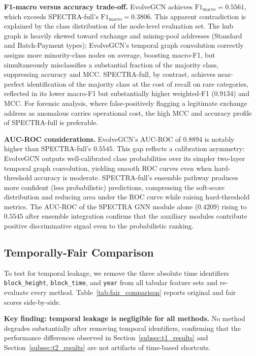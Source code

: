 \documentclass[journal]{IEEEtran}
\begin{document}
\textbf{F1-macro versus accuracy trade-off.}
EvolveGCN achieves $\text{F1}_{\text{macro}} = \num{0.5561}$, which
exceeds SPECTRA-full's $\text{F1}_{\text{macro}} = \num{0.3806}$.
This apparent contradiction is explained by the class distribution of the
node-level evaluation set.
The hub graph is heavily skewed toward exchange and mining-pool addresses
(Standard and Batch-Payment types); EvolveGCN's temporal graph convolution
correctly assigns more minority-class nodes on average, boosting macro-F1,
but simultaneously misclassifies a substantial fraction of the majority
class, suppressing accuracy and MCC.
SPECTRA-full, by contrast, achieves near-perfect identification of the
majority class at the cost of recall on rare categories, reflected in its
lower macro-F1 but substantially higher weighted-F1 ($\num{0.9134}$)
and MCC.
For forensic analysis, where false-positively flagging a legitimate exchange
address as anomalous carries operational cost, the high MCC and accuracy
profile of SPECTRA-full is preferable.

\textbf{AUC-ROC considerations.}
EvolveGCN's AUC-ROC of \num{0.8894} is notably higher than SPECTRA-full's
$\num{0.5545}$.
This gap reflects a calibration asymmetry: EvolveGCN outputs well-calibrated
class probabilities over its simpler two-layer temporal graph convolution,
yielding smooth ROC curves even when hard-threshold accuracy is moderate.
SPECTRA-full's ensemble pathway produces more confident (less probabilistic)
predictions, compressing the soft-score distribution and reducing area under
the ROC curve while raising hard-threshold metrics.
The AUC-ROC of the SPECTRA GNN module alone ($\num{0.4209}$) rising to
$\num{0.5545}$ after ensemble integration confirms that the auxiliary modules
contribute positive discriminative signal even to the probabilistic ranking.


\subsection{Temporally-Fair Comparison}
\label{subsec:fair_results}

To test for temporal leakage, we remove the three absolute time identifiers
\texttt{block\_height}, \texttt{block\_time}, and \texttt{year} from all
tabular feature sets and re-evaluate every method.
Table~\ref{tab:fair_comparison} reports original and fair scores side-by-side.

\textbf{Key finding: temporal leakage is negligible for all methods.}
No method degrades substantially after removing temporal identifiers,
confirming that the performance differences observed in
Section~\ref{subsec:t1_results} and Section~\ref{subsec:t2_results}
are not artifacts of time-based shortcuts.
\end{document}
